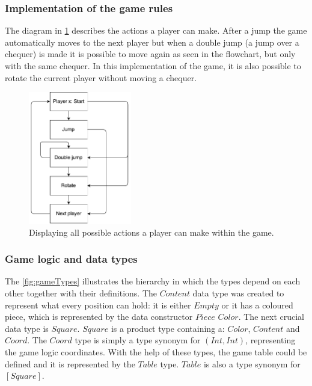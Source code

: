 \documentclass[a4paper]{article}
\begin{document}
\subsubsection{Implementation of the game rules}
\label{sec:game-rules}
The diagram in \cref{fig:flowchartGame} describes the actions a player can make. After a jump the game automatically moves to the next player but when a double jump (a jump over a chequer) is made it is possible to move again as seen in the flowchart, but only with the same chequer. In this implementation of the game, it is also possible to rotate the current player without moving a chequer. 
\begin{figure}[ht!]
    \centering
    \includegraphics[scale=0.1,width=0.4\textwidth]{figure/flowchartGame}
    \caption{Displaying all possible actions a player can make within the game.}
    \label{fig:flowchartGame}
\end{figure}

\subsubsection{Game logic and data types}

The \cref{fig:gameTypes} illustrates the hierarchy in which the types depend on each other together with their definitions. The $Content$ data type was created to represent what every position can hold: it is either $Empty$ or it has a coloured piece, which is represented by the data constructor $Piece$ $Color$. The next crucial data type is $Square$. $Square$ is a product type containing a: $Color$, $Content$ and $Coord$. The $Coord$ type is simply a type synonym for $(Int,Int)$, representing the game logic coordinates. With the help of these types, the game table could be defined and it is represented by the $Table$ type. $Table$ is also a type synonym for $[Square]$. 
\end{document}
